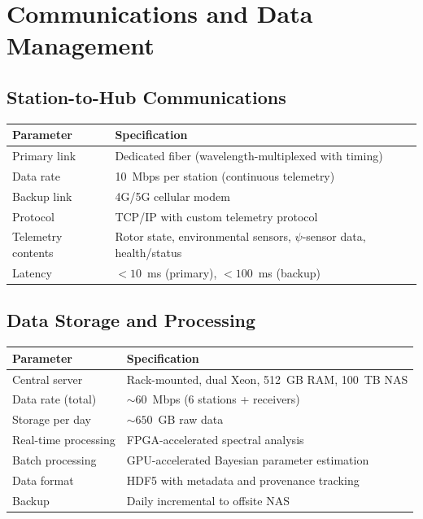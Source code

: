 \documentclass[11pt,a4paper]{article}
\begin{document}
\section{Communications and Data Management}

\subsection{Station-to-Hub Communications}

\begin{longtable}{p{5cm}p{8cm}}
\toprule
\textbf{Parameter} & \textbf{Specification} \\
\midrule
\endfirsthead
Primary link & Dedicated fiber (wavelength-multiplexed with timing) \\
Data rate & 10~Mbps per station (continuous telemetry) \\
Backup link & 4G/5G cellular modem \\
Protocol & TCP/IP with custom telemetry protocol \\
Telemetry contents & Rotor state, environmental sensors, $\psi$-sensor data,
  health/status \\
Latency & $< 10$~ms (primary), $< 100$~ms (backup) \\
\bottomrule
\end{longtable}

\subsection{Data Storage and Processing}

\begin{longtable}{p{5cm}p{8cm}}
\toprule
\textbf{Parameter} & \textbf{Specification} \\
\midrule
\endfirsthead
Central server & Rack-mounted, dual Xeon, 512~GB RAM, 100~TB NAS \\
Data rate (total) & $\sim 60$~Mbps (6 stations + receivers) \\
Storage per day & $\sim 650$~GB raw data \\
Real-time processing & FPGA-accelerated spectral analysis \\
Batch processing & GPU-accelerated Bayesian parameter estimation \\
Data format & HDF5 with metadata and provenance tracking \\
Backup & Daily incremental to offsite NAS \\
\bottomrule
\end{longtable}
\end{document}

